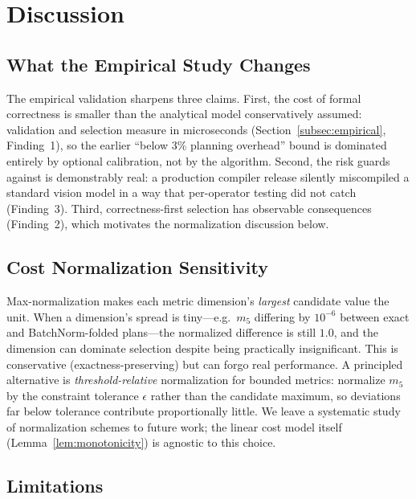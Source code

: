 \section{Discussion}
\label{sec:discussion}

\subsection{What the Empirical Study Changes}

The empirical validation sharpens three claims. First, the cost of
formal correctness is smaller than the analytical model conservatively
assumed: validation and selection measure in microseconds
(Section~\ref{subsec:empirical}, Finding~1), so the earlier
``below 3\% planning overhead'' bound is dominated entirely by optional
calibration, not by the algorithm. Second, the risk \gate{} guards
against is demonstrably real: a production compiler release silently
miscompiled a standard vision model in a way that per-operator testing
did not catch (Finding~3). Third, correctness-first selection has
observable consequences (Finding~2), which motivates the normalization
discussion below.

\subsection{Cost Normalization Sensitivity}

Max-normalization makes each metric dimension's \emph{largest} candidate
value the unit. When a dimension's spread is tiny---e.g.\ $m_5$
differing by $10^{-6}$ between exact and BatchNorm-folded plans---the
normalized difference is still $1.0$, and the dimension can dominate
selection despite being practically insignificant. This is
conservative (exactness-preserving) but can forgo real performance.
A principled alternative is \emph{threshold-relative} normalization for
bounded metrics: normalize $m_5$ by the constraint tolerance
$\epsilon$ rather than the candidate maximum, so deviations far below
tolerance contribute proportionally little. We leave a systematic
study of normalization schemes to future work; the linear cost model
itself (Lemma~\ref{lem:monotonicity}) is agnostic to this choice.

\subsection{Limitations}

